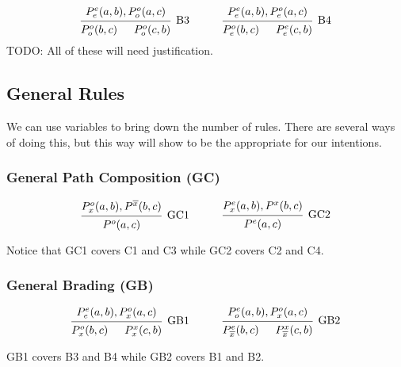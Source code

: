 \[
\begin{prooftree}[downwards]
  \Hypo{P^o_o(b,c)}
  \Hypo{P^o_o(c,b)}
  \Infer2[B3]{P^e_e(a,b), P^o_o(a,c)}
\end{prooftree}
\quad \quad \quad
\begin{prooftree}[downwards]
  \Hypo{P^o_e(b,c)}
  \Hypo{P^e_e(c,b)}
  \Infer2[B4]{P^e_e(a,b), P^o_e(a,c)}
\end{prooftree}
\]
TODO: All of these will need justification.
\subsection{General Rules}
\label{sub:General Rules}
We can use variables to bring down the number of rules.
There are several ways of doing this, but this way will show to be the appropriate for our intentions.
\subsubsection{General Path Composition (GC)}
\label{subs:Path Composition}
\[
\begin{prooftree}
  \Hypo{\pox(a,b),P^{\overline{x}}(b,c)}
  \Infer1[GC1]{P^o(a,c)}
\end{prooftree}
\quad \quad \quad
\begin{prooftree}
  \Hypo{\pex(a,b),P^x(b,c)}
  \Infer1[GC2]{P^e(a,c)}
\end{prooftree}
\]

Notice that GC1 covers C1 and C3 while GC2 covers C2 and C4.
\subsubsection{General Brading (GB)}
\label{subs:General Brading (GB)}
\[
\begin{prooftree}[downwards]
  \Hypo{\p ox(b,c)}
  \Hypo{\p xx(c,b)}
  \Infer2[GB1]{\p ee(a,b),\p ox(a,c)}
\end{prooftree}
\quad \quad \quad
\begin{prooftree}[downwards]
  \Hypo{\penx(b,c)}
  \Hypo{\p x{\overline{x}}(c,b)}
  \Infer2[GB2]{\peo(a,b), \pox(a,c)}
\end{prooftree}
\]

GB1 covers B3 and B4 while GB2 covers B1 and B2.
